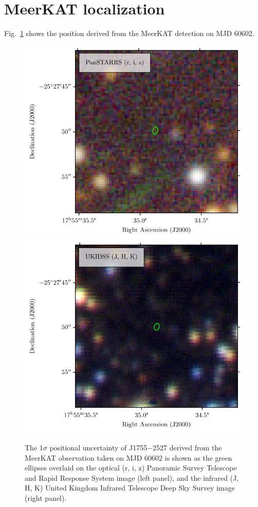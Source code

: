 \documentclass[fleqn,usenatbib]{mnras}
\newcommand{\src}{J1755$-$2527}
\newcommand{\Fig}{Fig.}
\begin{document}








\appendix

\section{MeerKAT localization}
\label{app:localization}

\Fig~\ref{fig:localization} shows the position derived from the MeerKAT detection on MJD 60602.

\begin{figure}
    \centering
    \includegraphics[width=0.48\linewidth]{J1755_optical.pdf}
    \includegraphics[width=0.48\linewidth]{J1755_nir.pdf}
    \caption{The $1\sigma$ positional uncertainty of \src{} derived from the MeerKAT observation taken on MJD 60602 is shown as the green ellipses overlaid on the optical (r, i, z) Panoramic Survey Telescope and Rapid Response System \citep[PanSTARRS;][]{2010SPIE.7733E..0EK,2016arXiv161205560C} image (left panel), and the infrared (J, H, K) United Kingdom Infrared Telescope Deep Sky Survey \citep[UKIDSS;][]{2007MNRAS.379.1599L} image (right panel).}
    \label{fig:localization}
\end{figure}
\end{document}
